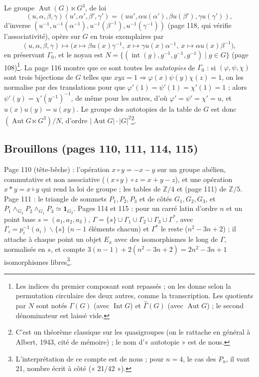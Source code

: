 \documentclass[11pt,a4paper]{article}
\begin{document}
Le groupe $\operatorname{Aut}(G) \ltimes G^3$, de loi
\[
(u, \alpha, \beta, \gamma)(u', \alpha', \beta', \gamma') = (uu', \alpha
u(\alpha'), \beta u(\beta'), \gamma u(\gamma')),
\]
d'inverse $(u^{-1}, u^{-1}(\alpha^{-1}), u^{-1}(\beta^{-1}), u^{-1}(\gamma^{-1}))$
(page 118, qui vérifie l'associativité), opère sur $G$ en trois exemplaires
par
\[
(u, \alpha, \beta, \gamma) \longmapsto \bigl(x \mapsto \beta u(x)
\gamma^{-1},\ x \mapsto \gamma u(x) \alpha^{-1},\ x \mapsto \alpha u(x)
\beta^{-1}\bigr) ,
\]
en préservant $\Gamma_0$, et le noyau est $N = \lbrace (\operatorname{int}(g),
g^{-1}, g^{-1}, g^{-1}) \mid g \in G\rbrace$ (page 108)\footnote{Les indices du
premier composant sont repassés ; on les donne selon la permutation circulaire
des deux autres, comme la transcription. Les quotients par $N$ sont notés
$\Gamma(G)$ (avec $\operatorname{Int} G$) et $\widehat\Gamma(G)$ (avec
$\operatorname{Aut} G$) ; le second dénominateur est laissé vide.}. La page
116 montre que ce sont toutes les \emph{autotopies} de $\Gamma_0$ : si $(\varphi,
\psi, \chi)$ sont trois bijections de $G$ telles que $xyz = 1 \Rightarrow
\varphi(x) \psi(y) \chi(z) = 1$, on les normalise par des translations
pour que $\varphi'(1) = \psi'(1) = \chi'(1) = 1$ ; alors $\psi'(y) =
\chi'(y^{-1})^{-1}$, de même pour les autres, d'où $\varphi' = \psi' = \chi' =
u$, et $u(x) u(y) = u(xy)$. Le groupe des autotopies de la table de $G$ est
donc $(\operatorname{Aut} G \ltimes G^3)/N$, d'ordre $|\operatorname{Aut}
G| \cdot |G|^2$\footnote{C'est un théorème classique sur les quasigroupes
(on le rattache en général à Albert, 1943, cité de mémoire) ; le nom
d'« autotopie » est de nous.}.

\subsection*{Brouillons (pages 110, 111, 114, 115)}

Page 110 (tête-bêche) : l'opération $x \circ y = -x - y$ sur un groupe
abélien, commutative et non associative ($(x \circ y) \circ z = x + y - z$),
et une opération $x \ast y = \overline{x \circ y}$ qui rend la loi de groupe ;
les tables de $\mathbb{Z}/4$ et (page 111) de $\mathbb{Z}/5$. Page 111 : le
triangle de sommets $P_1, P_2, P_3$ et de côtés $G_1, G_2, G_3$, et
$P_1 \wedge_{G_3} P_2 \wedge_{G_1} P_3 \simeq \mathbf{1}_{G_2}$. Pages 114 et
115 : pour un carré latin d'ordre $n$ et un point base $s = (a_1, a_2, a_3)$,
$\Gamma = \lbrace s\rbrace \cup \Gamma_1 \cup \Gamma_2 \cup \Gamma_3 \cup
\Gamma^*$, avec $\Gamma_i = p_i^{-1}(a_i) \smallsetminus \lbrace s\rbrace$
($n - 1$ éléments chacun) et $\Gamma^*$ le reste ($n^2 - 3n + 2$) ; il attache
à chaque point un objet $E_x$ avec des isomorphismes le long de $\Gamma$,
normalisés en $s$, et compte $3(n - 1) + 2(n^2 - 3n + 2) = 2n^2 - 3n + 1$
isomorphismes libres\footnote{L'interprétation de ce compte est de nous ;
pour $n = 4$, le cas des $P_u$, il vaut 21, nombre écrit à côté (« 21/42 »).}.
\end{document}
